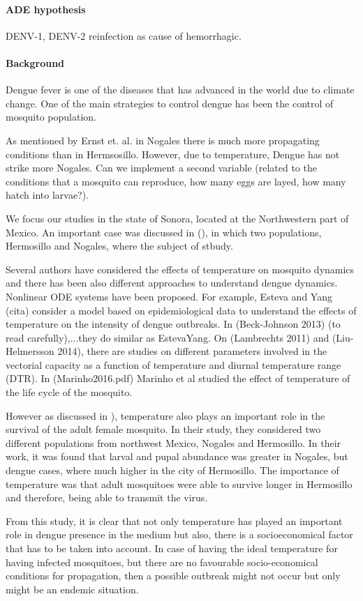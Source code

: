 \paragraph{ADE hypothesis}
\ac{DENV-1}, \ac{DENV-2}
reinfection as cause of hemorrhagic.
\paragraph{Background}

	Dengue fever is one of the diseases that has advanced in the
world due to climate change. One of the main strategies to control dengue has
been the control of mosquito population.

	As mentioned by Ernst et. al. \citet{Ernst2016} in Nogales there
is much more propagating conditions than in Hermsosillo. However,
due to temperature, Dengue has not strike more Nogales. Can we
implement a second variable (related to the conditions that a
mosquito can reproduce, how many eggs are layed, how many hatch into larvae?).

\noindent We focus our studies in the state of Sonora, located at the Northwestern part of Mexico. An important case was discussed in (\cite{Ernst2016}), in which two populations, Hermosillo and Nogales, where the subject of stbudy.

\noindent Several authors have considered the effects of temperature on mosquito dynamics and there has been also different approaches to understand dengue dynamics. Nonlinear ODE systems have been proposed. For example, Esteva and Yang (cita) consider a model based on epidemiological data to understand the effects of temperature on the intensity of dengue outbreaks. In (Beck-Johnson 2013) (to read carefully),...they do similar as EstevaYang. On (Lambrechts 2011) and (Liu-Helmersson 2014), there are studies on different parameters involved in the vectorial capacity as a function of temperature and diurnal temperature range (DTR). In (Marinho2016.pdf) Marinho et al studied the effect of temperature of the life cycle of the mosquito.


\noindent However as discussed in \cite{Ernst2016}), temperature also plays an important role in the survival of the adult female mosquito. In their study, they considered two different populations from northwest Mexico, Nogales and Hermosillo. In their work, it was found that larval and pupal abundance was greater in Nogales, but dengue cases, where much higher in the city of Hermosillo. The importance of temperature was that adult mosquitoes were able to survive longer in Hermosillo and therefore, being able to transmit the virus.

\noindent From this study, it is clear that not only temperature has played an important role in dengue presence in the medium but also, there is a socioeconomical factor that has to be taken into account. In case of having the ideal temperature for having infected mosquitoes, but there are no favourable socio-economical conditions for propagation, then a possible outbreak might not occur but only might be an endemic situation.
